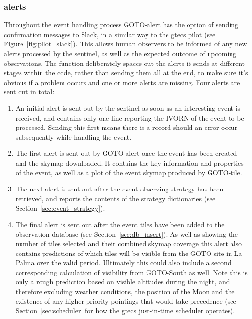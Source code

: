 \begin{colsection}
\begin{colsection}
\subsubsection{ alerts}

Throughout the event handling process GOTO-alert has the option of sending confirmation messages to Slack, in a similar way to the \gls{gtecs} pilot (see Figure~\ref{fig:pilot_slack}). This allows human observers to be informed of any new alerts processed by the sentinel, as well as the expected outcome of upcoming observations. The function deliberately spaces out the alerts it sends at different stages within the code, rather than sending them all at the end, to make sure it's obvious if a problem occurs and one or more alerts are missing. Four alerts are sent out in total:

\begin{enumerate}
    \item An initial alert is sent out by the sentinel as soon as an interesting event is received, and contains only one line reporting the IVORN of the event to be processed. Sending this first means there is a record should an error occur subsequently while handling the event.
    \item The first alert is sent out by GOTO-alert once the event has been created and the skymap downloaded. It contains the key information and properties of the event, as well as a plot of the event skymap produced by GOTO-tile.
    \item The next alert is sent out after the event observing strategy has been retrieved, and reports the contents of the strategy dictionaries (see Section~\ref{sec:event_strategy}).
    \item The final alert is sent out after the event tiles have been added to the observation database (see Section~\ref{sec:db_insert}). As well as showing the number of tiles selected and their combined skymap coverage this alert also contains predictions of which tiles will be visible from the GOTO site in La Palma over the valid period. Ultimately this could also include a second corresponding calculation of visibility from GOTO-South as well. Note this is only a rough prediction based on visible altitudes during the night, and therefore excluding weather conditions, the position of the Moon and the existence of any higher-priority pointings that would take precedence (see Section~\ref{sec:scheduler} for how the \gls{gtecs} just-in-time scheduler operates).
\end{enumerate}


\end{colsection}
\end{colsection}

